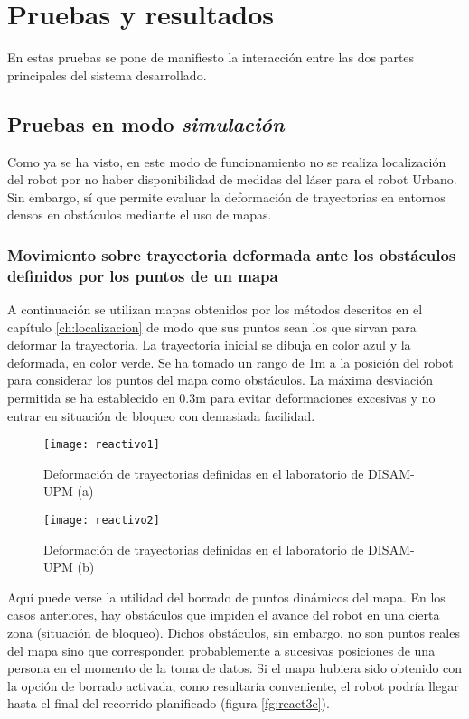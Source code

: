 \section{Pruebas y resultados}
En estas pruebas se pone de manifiesto la interacción entre las dos partes principales del sistema desarrollado.

\subsection{Pruebas en modo \emph{simulación}}
Como ya se ha visto, en este modo de funcionamiento no se realiza localización del robot por no haber disponibilidad de medidas del láser para el robot Urbano. Sin embargo, sí que permite evaluar la deformación de trayectorias en entornos densos en obstáculos mediante el uso de mapas.

\subsubsection{Movimiento sobre trayectoria deformada ante los obstáculos definidos por los puntos de un mapa}
A continuación se utilizan mapas obtenidos por los métodos descritos en el capítulo \ref{ch:localizacion} de modo que sus puntos sean los que sirvan para deformar la trayectoria. La trayectoria inicial se dibuja en color azul y la deformada, en color verde. Se ha tomado un rango de 1m a la posición del robot para considerar los puntos del mapa como obstáculos. La máxima desviación permitida se ha establecido en 0.3m para evitar deformaciones excesivas y no entrar en situación de bloqueo con demasiada facilidad.%

\begin{figure}[htb]
  \centering\texttt{[image: reactivo1]}
   \caption{Deformación de trayectorias definidas en el laboratorio de DISAM-UPM (a)}\label{fg:react3a}
\end{figure}

\begin{figure}[htb]
  \centering\texttt{[image: reactivo2]}
  \caption{Deformación de trayectorias definidas en el laboratorio de DISAM-UPM (b)}\label{fg:react3b}
\end{figure}

\clearpage
Aquí puede verse la utilidad del borrado de puntos dinámicos del mapa. En los casos anteriores, hay obstáculos que impiden el avance del robot en una cierta zona (situación de bloqueo). Dichos obstáculos, sin embargo, no son puntos reales del mapa sino que corresponden probablemente a sucesivas posiciones de una persona en el momento de la toma de datos. Si el mapa hubiera sido obtenido con la opción de borrado activada, como resultaría conveniente, el robot podría llegar hasta el final del recorrido planificado (figura \ref{fg:react3c}).

